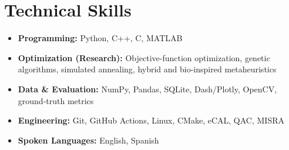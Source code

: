 \section{Technical Skills}
\begin{itemize}[leftmargin=0.15in, label={}, itemsep=0pt, parsep=0pt]
    \small
    \item \textbf{Programming:} Python, C++, C, MATLAB
    \item \textbf{Optimization (Research):} Objective-function optimization, genetic algorithms, simulated annealing, hybrid and bio-inspired metaheuristics
    \item \textbf{Data \& Evaluation:} NumPy, Pandas, SQLite, Dash/Plotly, OpenCV, ground-truth metrics
    \item \textbf{Engineering:} Git, GitHub Actions, Linux, CMake, eCAL, QAC, MISRA
    \item \textbf{Spoken Languages:} English, Spanish
\end{itemize}